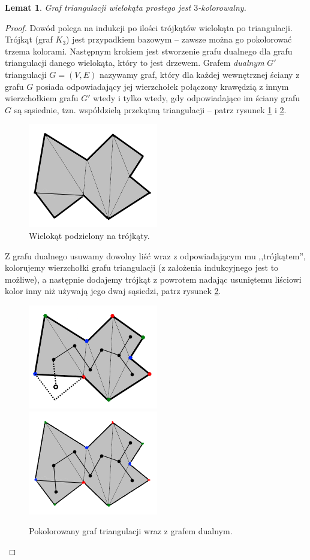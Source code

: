 \documentclass[brudnopis]{xmgr}
\newtheorem{Lemat}{Lemat}
\theoremstyle{definition}
\begin{document}
\begin{Lemat} \cite{fisk}
Graf triangulacji wielokąta prostego jest $3$-kolorowalny.
\end{Lemat}
\begin{proof}
	Dowód polega na indukcji po ilości trójkątów wielokąta po triangulacji. Trójkąt (graf $K_3$) jest przypadkiem bazowym -- zawsze można go pokolorować trzema kolorami. Następnym krokiem jest stworzenie grafu  dualnego dla grafu triangulacji danego wielokąta, który to jest drzewem. Grafem \emph{dualnym} $G'$ triangulacji $G=(V,E)$ nazywamy graf, który dla każdej wewnętrznej ściany z grafu $G$ posiada odpowiadający jej wierzchołek połączony krawędzią z innym wierzchołkiem grafu $G'$ wtedy i tylko wtedy, gdy odpowiadające im ściany grafu $G$ są sąsiednie, tzn. współdzielą przekątną triangulacji -- patrz rysunek \ref{fig:triangulacja_wielokata} i \ref{fig:graf_triangulacji}.
	\begin{figure}[ht!]
	  \centering
	  \includegraphics{rysunki/dual.png}
	    \caption{Wielokąt podzielony na trójkąty.}
      \label{fig:triangulacja_wielokata}
	\end{figure} 
	Z grafu dualnego usuwamy dowolny liść wraz z odpowiadającym mu ,,trójkątem'', kolorujemy wierzchołki grafu triangulacji (z założenia indukcyjnego jest to możliwe), a następnie dodajemy trójkąt z powrotem nadając usuniętemu liściowi kolor inny niż używają jego dwaj sąsiedzi, patrz rysunek \ref{fig:graf_triangulacji}.
  \begin{figure}[ht!]
    \centering
      \includegraphics{rysunki/dual_kolor.png} 
      \includegraphics{rysunki/dual_caly_kolor.png}
      \caption{Pokolorowany graf triangulacji wraz z grafem dualnym.}
      \label{fig:graf_triangulacji}
  \end{figure} 
\end{proof}
\end{document}
